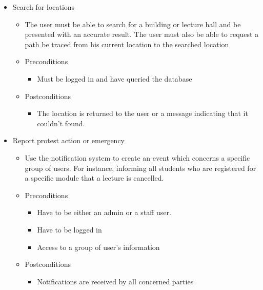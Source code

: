 \documentclass[12pt]{article}
\begin{document}
\begin{enumerate}
\begin{itemize}
				\item Search for locations
				\begin{itemize}
					\item The user must be able to search for a building or lecture hall and be presented with an accurate result. The user must also be able to request a path be traced from his current location to the searched location
					\item Preconditions
					\begin{itemize}
						\item Must be logged in and have queried the database
					\end{itemize}
					\item Postconditions
					\begin{itemize}
						\item The location is returned to the user or a message indicating that it couldn’t found.
					\end{itemize}
				\end{itemize}
				
				\item Report protest action or emergency
				\begin{itemize}
					\item Use the notification system to create an event which concerns a specific group of users. For instance, informing all students who are registered for a specific module that a lecture is cancelled.
					\item Preconditions
					\begin{itemize}
						\item Have to be either an admin or a staff user.
						\item Have to be logged in
						\item Access to a group of user’s information
					\end{itemize}
					\item Postconditions
					\begin{itemize}
						\item Notifications are received by all concerned parties
					\end{itemize}
				\end{itemize}
				

\end{itemize}
\end{enumerate}
\end{document}
